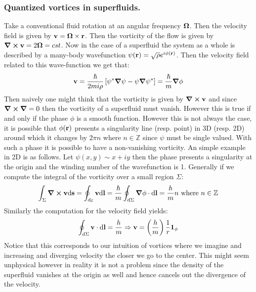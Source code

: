 \documentclass[10pt,a4paper]{book}
\begin{document}
\subsubsection{Quantized vortices in superfluids.}
Take a conventional fluid rotation at an angular frequency $\vb{\Omega}$. Then the velocity field is given by $\vb{v} = \vb{\Omega} \times \vb{r}$. Then the vorticity of the flow is given by $\curl \vb{v} = 2 \vb{\Omega} = cst$. Now in the case of a superfluid the system as a whole is described by a many-body wavefunction $\psi(\vb{r}) = \sqrt{\rho} e^{i \phi (\vb{r})}$. Then the velocity field related to this wave-function we get that:
\[
\vb{v} = \frac{\hbar}{2 m i \rho} \left[ \psi^* \grad \psi - \psi \grad \psi^* \right] = \frac{\hbar}{m} \grad \phi
\]
Then naively one might think that the vorticity is given by $\curl \vb{v}$ and since $\curl \grad = 0$ then the vorticity of a superfluid must vanish. However this is true if and only if the phase $\phi$ is a smooth function. However this is not always the case, it is possible that $\phi(\vb{r})$ presents a singularity line (resp. point) in 3D (resp. 2D) around which it changes by $2\pi n$ where $n \in \mathbb{Z}$ since $\psi$ must be single valued. With such a phase it is possible to have a non-vanishing vorticity. An simple example in 2D is as follows. Let $\psi(x,y) \sim x + iy$ then the phase presents a singularity at the origin and the winding number of the wavefunction is 1. Generally if we compute the integral of the vorticity over a small region $\Sigma$:
\[
\int_\Sigma \curl \vb{v} \dd \vb{s} = \oint_{\dd \varepsilon} \vb{v} \dd \vb{l} =  \frac{\hbar}{m} \oint_{\dd\Sigma} \grad \phi \cdot  \dd \vb{l} = \frac{h}{m} n \text{ where } n \in \mathbb{Z}
\] 
Similarly the computation for the velocity field yields:
\[
\oint_{\dd\Sigma} \vb{v} \cdot \dd \vb{l} = \frac{h}{m} \Rightarrow \vb{v} = \left(\frac{h}{m}\right)\frac{1}{r} \vb{1}_\phi
\]
Notice that this corresponds to our intuition of vortices where we imagine and increasing and diverging velocity the closer we go to the center. This might seem unphysical however in reality it is not a problem since the density of the superfluid vanishes at the origin as well and hence cancels out the divergence of the velocity. 
\end{document}
